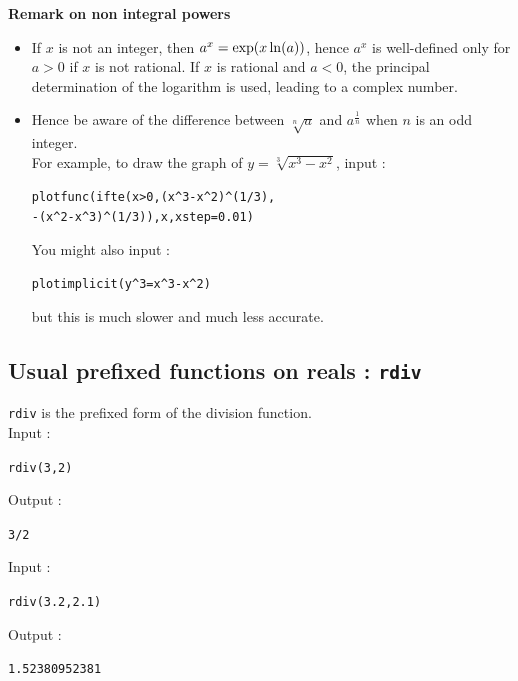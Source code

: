 \documentclass[a4paper,11pt]{book}
\begin{document}
{\bf Remark on non integral powers }
\begin{itemize}
\item If $x$ is not an integer, then $a^x=\exp(x \* \ln(a))$, hence 
$a^x$ is well-defined only for $a>0$ if $x$ is not rational. If $x$
is rational and $a<0$, the principal determination of the logarithm 
is used, leading to a complex number.
\item Hence be aware of the difference between $\sqrt[n]{a}$ and $a^{\frac{1}{n}}$ 
when $n$ is an odd integer.\\
For example, to draw the graph of $y=\sqrt[3]{x^3-x^2}$, input :
\begin{center}
{\tt plotfunc(ifte(x>0,(x\verb|^|3-x\verb|^|2)\verb|^|(1/3),\\
-(x\verb|^|2-x\verb|^|3)\verb|^|(1/3)),x,xstep=0.01)}
\end{center}
You might also input :
\begin{center}{\tt plotimplicit(y\verb|^|3=x\verb|^|3-x\verb|^|2)}\end{center}
but this is much slower and much less accurate.
\end{itemize}

\subsection{Usual prefixed functions on reals : {\tt rdiv}} 
{\tt rdiv} is the prefixed form of the division function.\\
Input :
\begin{center}{\tt rdiv(3,2)}\end{center}
Output :
\begin{center}{\tt 3/2}\end{center}
Input :
\begin{center}{\tt rdiv(3.2,2.1)}\end{center}
Output :
\begin{center}{\tt 1.52380952381}\end{center}
\end{document}
